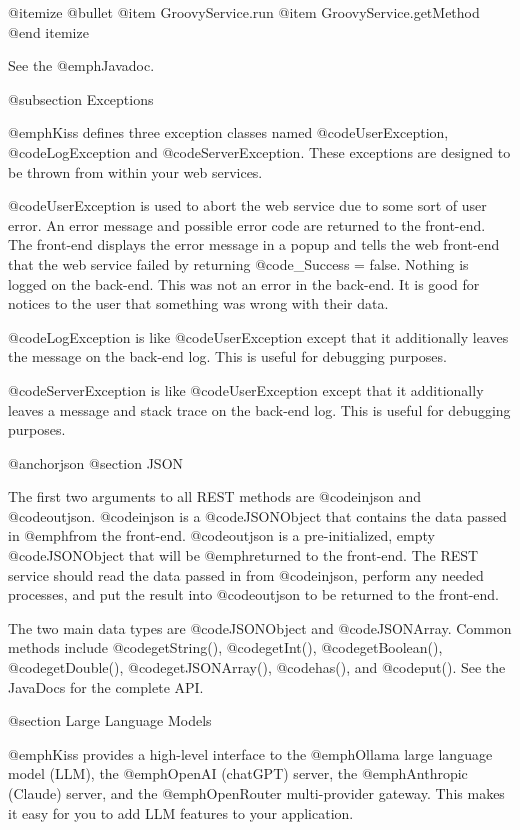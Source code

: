 @itemize @bullet
@item
GroovyService.run
@item
GroovyService.getMethod
@end itemize

See the @emph{Javadoc}.

@subsection Exceptions

@emph{Kiss} defines three exception classes named
@code{UserException}, @code{LogException} and @code{ServerException}.
These exceptions are designed to be thrown from within your web
services.

@code{UserException} is used to abort the web service due to some sort
of user error.  An error message and possible error code are
returned to the front-end.  The front-end displays the error message
in a popup and tells the web front-end that the web service failed by
returning @code{_Success = false}.  Nothing is logged on the back-end.
This was not an error in the back-end.  It is good for notices to the user that
something was wrong with their data.

@code{LogException} is like @code{UserException} except that it additionally leaves the message on the back-end log.  This is useful
for debugging purposes.

@code{ServerException} is like @code{UserException} except that it additionally leaves a message and stack trace on the back-end log.  This is useful
for debugging purposes.

@anchor{json}
@section JSON

The first two arguments to all REST methods are @code{injson} and
@code{outjson}.  @code{injson} is a @code{JSONObject} that contains
the data passed in @emph{from} the front-end.  @code{outjson} is a
pre-initialized, empty @code{JSONObject} that will be @emph{returned
to} the front-end.  The REST service should read the data passed in
from @code{injson}, perform any needed processes, and put the result
into @code{outjson} to be returned to the front-end.

The two main data types are @code{JSONObject} and @code{JSONArray}.
Common methods include @code{getString()}, @code{getInt()},
@code{getBoolean()}, @code{getDouble()}, @code{getJSONArray()},
@code{has()}, and @code{put()}.  See the JavaDocs for the complete API.

@section Large Language Models

@emph{Kiss} provides a high-level interface to the @emph{Ollama} large language model (LLM), the @emph{OpenAI} (chatGPT) server, the @emph{Anthropic} (Claude) server, and the @emph{OpenRouter} multi-provider gateway. This makes it easy for you to add LLM features to your application.

